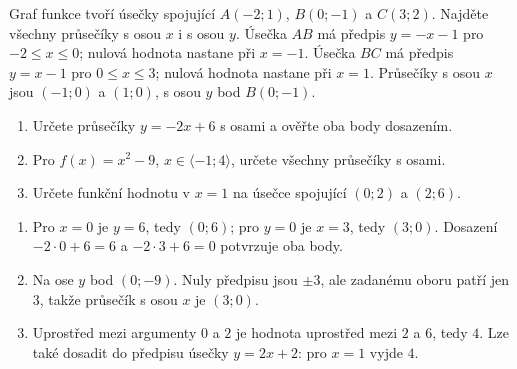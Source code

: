 \documentclass[11pt,a4paper]{article}
\begin{document}
\begin{zadaniReseniBox}
Graf funkce tvoří úsečky spojující $A(-2;1)$, $B(0;-1)$ a $C(3;2)$. Najděte všechny průsečíky s osou $x$ i s osou $y$.
\tcblower
Úsečka $AB$ má předpis $y=-x-1$ pro $-2\le x\le0$; nulová hodnota nastane při $x=-1$. Úsečka $BC$ má předpis $y=x-1$ pro $0\le x\le3$; nulová hodnota nastane při $x=1$. Průsečíky s osou $x$ jsou $(-1;0)$ a $(1;0)$, s osou $y$ bod $B(0;-1)$.
\end{zadaniReseniBox}
\begin{zadaniReseniBox}
\begin{enumerate}[label=\alph*)]
\item Určete průsečíky $y=-2x+6$ s osami a ověřte oba body dosazením.
\item Pro $f(x)=x^2-9$, $x\in\langle-1;4\rangle$, určete všechny průsečíky s osami.
\item Určete funkční hodnotu v $x=1$ na úsečce spojující $(0;2)$ a $(2;6)$.
\end{enumerate}
\tcblower
\begin{enumerate}[label=\alph*)]
\item Pro $x=0$ je $y=6$, tedy $(0;6)$; pro $y=0$ je $x=3$, tedy $(3;0)$. Dosazení $-2\cdot0+6=6$ a $-2\cdot3+6=0$ potvrzuje oba body.
\item Na ose $y$ bod $(0;-9)$. Nuly předpisu jsou $\pm3$, ale zadanému oboru patří jen $3$, takže průsečík s osou $x$ je $(3;0)$.
\item Uprostřed mezi argumenty $0$ a $2$ je hodnota uprostřed mezi $2$ a $6$, tedy $4$. Lze také dosadit do předpisu úsečky $y=2x+2$: pro $x=1$ vyjde $4$.
\end{enumerate}
\end{zadaniReseniBox}
\end{document}
